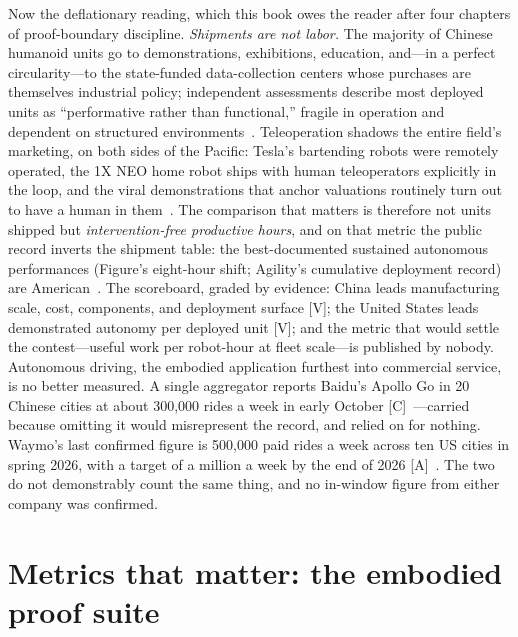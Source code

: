 Now the deflationary reading, which this book owes the reader after four chapters of proof-boundary discipline. \emph{Shipments are not labor.} The majority of Chinese humanoid units go to demonstrations, exhibitions, education, and---in a perfect circularity---to the state-funded data-collection centers whose purchases are themselves industrial policy; independent assessments describe most deployed units as ``performative rather than functional,'' fragile in operation and dependent on structured environments~\cite{fortune-humanoid}. Teleoperation shadows the entire field's marketing, on both sides of the Pacific: Tesla's bartending robots were remotely operated, the 1X NEO home robot ships with human teleoperators explicitly in the loop, and the viral demonstrations that anchor valuations routinely turn out to have a human in them~\cite{teleop}. The comparison that matters is therefore not units shipped but \emph{intervention-free productive hours}, and on that metric the public record inverts the shipment table: the best-documented sustained autonomous performances (Figure's eight-hour shift; Agility's cumulative deployment record) are American~\cite{helix,agility-spac}. The scoreboard, graded by evidence: China leads manufacturing scale, cost, components, and deployment surface [V]; the United States leads demonstrated autonomy per deployed unit [V]; and the metric that would settle the contest---useful work per robot-hour at fleet scale---is published by nobody. Autonomous driving, the embodied application furthest into commercial service, is no better measured. A single aggregator reports Baidu's Apollo Go in 20 Chinese cities at about 300{,}000 rides a week in early October [C]~\cite{hw-robotaxi-counts}---carried because omitting it would misrepresent the record, and relied on for nothing. Waymo's last confirmed figure is 500{,}000 paid rides a week across ten US cities in spring 2026, with a target of a million a week by the end of 2026 [A]~\cite{hw-robotaxi-counts}. The two do not demonstrably count the same thing, and no in-window figure from either company was confirmed.

\section{Metrics that matter: the embodied proof suite}
\label{sec:embodied-metrics}

